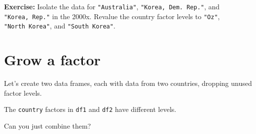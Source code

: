 \documentclass[
]{book}
\newenvironment{Shaded}{\begin{snugshade}}{\end{snugshade}}
\newcommand{\CommentTok}[1]{\textcolor[rgb]{0.56,0.35,0.01}{\textit{#1}}}
\newcommand{\DecValTok}[1]{\textcolor[rgb]{0.00,0.00,0.81}{#1}}
\newcommand{\KeywordTok}[1]{\textcolor[rgb]{0.13,0.29,0.53}{\textbf{#1}}}
\newcommand{\NormalTok}[1]{#1}
\newcommand{\OperatorTok}[1]{\textcolor[rgb]{0.81,0.36,0.00}{\textbf{#1}}}
\newcommand{\StringTok}[1]{\textcolor[rgb]{0.31,0.60,0.02}{#1}}
\begin{document}
\textbf{Exercise:} Isolate the data for \texttt{"Australia"}, \texttt{"Korea,\ Dem.\ Rep."}, and \texttt{"Korea,\ Rep."} in the 2000x. Revalue the country factor levels to \texttt{"Oz"}, \texttt{"North\ Korea"}, and \texttt{"South\ Korea"}.

\hypertarget{grow-a-factor}{%
\section{Grow a factor}\label{grow-a-factor}}

Let's create two data frames, each with data from two countries, dropping unused factor levels.

\begin{Shaded}
\end{Shaded}

The \texttt{country} factors in \texttt{df1} and \texttt{df2} have different levels.

\begin{Shaded}
\end{Shaded}

Can you just combine them?

\begin{Shaded}
\end{Shaded}
\end{document}
